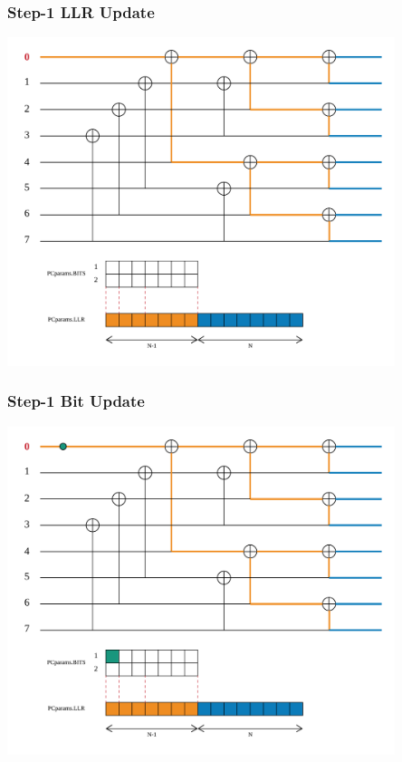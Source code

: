 \documentclass{beamer}
\begin{document}
\begin{frame}
\frametitle{Step-1 LLR Update}
  \begin{center}
  \includegraphics[width=0.85\textwidth]{pics/polar_-_SC_llr_1.png}
  \end{center}
\end{frame}

\begin{frame}
\frametitle{Step-1 Bit Update}
  \begin{center}
  \includegraphics[width=0.85\textwidth]{pics/polar_-_SC_bit_1.png}
  \end{center}
\end{frame}
\end{document}
